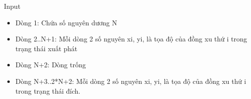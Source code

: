 Input  
\begin{itemize}
	\item     Dòng 1: Chứa số nguyên dương N   
	\item     Dòng 2..N+1: Mỗi dòng 2 số nguyên xi, yi, là tọa độ của đồng xu thứ i trong trạng thái xuất phát   
	\item     Dòng N+2: Dòng trống   
	\item     Dòng N+3..2*N+2: Mỗi dòng 2 số nguyên xi, yi, là tọa độ của đồng xu thứ i trong trạng thái đích.   
\end{itemize}